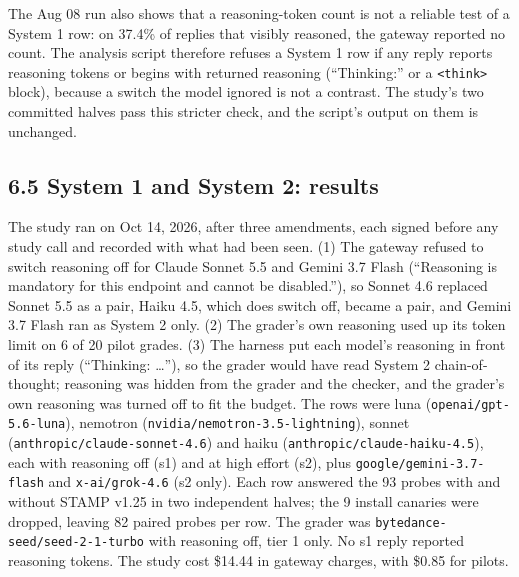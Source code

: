\documentclass[
  11pt,
]{article}
\begin{document}
The Aug 08 run also shows that a reasoning-token count is not a reliable
test of a System 1 row: on 37.4\% of replies that visibly reasoned, the
gateway reported no count. The analysis script therefore refuses a
System 1 row if any reply reports reasoning tokens or begins with
returned reasoning (``Thinking:'' or a
\texttt{\textless{}think\textgreater{}} block), because a switch the
model ignored is not a contrast. The study's two committed halves pass
this stricter check, and the script's output on them is unchanged.

\hypertarget{system-1-and-system-2-results}{%
\subsection{6.5 System 1 and System 2:
results}\label{system-1-and-system-2-results}}

The study ran on Oct 14, 2026, after three amendments, each signed
before any study call and recorded with what had been seen. (1) The
gateway refused to switch reasoning off for Claude Sonnet 5.5 and Gemini
3.7 Flash (``Reasoning is mandatory for this endpoint and cannot be
disabled.''), so Sonnet 4.6 replaced Sonnet 5.5 as a pair, Haiku 4.5,
which does switch off, became a pair, and Gemini 3.7 Flash ran as System
2 only. (2) The grader's own reasoning used up its token limit on 6 of
20 pilot grades. (3) The harness put each model's reasoning in front of
its reply (``Thinking: \ldots{}''), so the grader would have read System
2 chain-of-thought; reasoning was hidden from the grader and the
checker, and the grader's own reasoning was turned off to fit the
budget. The rows were luna (\texttt{openai/gpt-5.6-luna}), nemotron
(\texttt{nvidia/nemotron-3.5-lightning}), sonnet
(\texttt{anthropic/claude-sonnet-4.6}) and haiku
(\texttt{anthropic/claude-haiku-4.5}), each with reasoning off (s1) and
at high effort (s2), plus \texttt{google/gemini-3.7-flash} and
\texttt{x-ai/grok-4.6} (s2 only). Each row answered the 93 probes with
and without STAMP v1.25 in two independent halves; the 9 install
canaries were dropped, leaving 82 paired probes per row. The grader was
\texttt{bytedance-seed/seed-2-1-turbo} with reasoning off, tier 1 only.
No s1 reply reported reasoning tokens. The study cost \$14.44 in gateway
charges, with \$0.85 for pilots.
\end{document}
